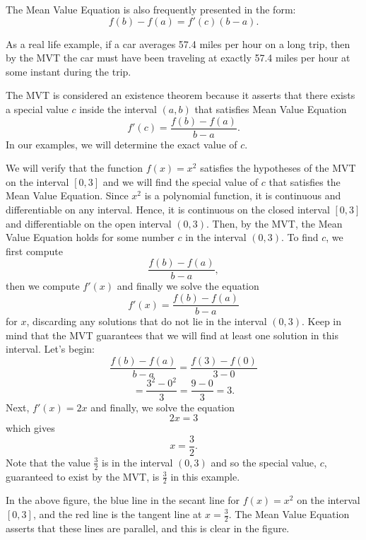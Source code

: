 \documentclass{ximera}
\begin{document}
The Mean Value Equation is also frequently presented in the form:
\[f(b) - f(a)=f'(c)(b-a).\]

As a real life example, if a car averages 57.4 miles per hour on a long trip, then by the MVT the car must have been 
traveling at exactly 57.4 miles per hour at some instant during the trip.

The MVT is considered an existence theorem because it asserts that there exists a special value $c$ inside the interval $(a,b)$
that satisfies Mean Value Equation 
\[f'(c) = \frac{f(b) - f(a)}{b-a}.\]
In our examples, we will determine the exact value of $c$. 

\begin{example}[example 1]
We will verify that the function $f(x) = x^2$ satisfies the hypotheses of the MVT
on the interval $[0,3]$ and we will find the special value of $c$ that satisfies the Mean Value Equation.
Since $x^2$ is a polynomial function, it is continuous and differentiable on any interval. 
Hence, it is continuous on the closed interval $[0, 3]$ and differentiable on the open interval $(0, 3)$. 
Then, by the MVT,  the Mean Value Equation holds for some number 
$c$ in the interval $(0, 3)$. To find $c$, we first compute
\[\frac{f(b) - f(a)}{b-a},\]
then we compute $f'(x)$
and finally we solve the equation
\[f'(x) = \frac{f(b) - f(a)}{b-a}\]
for $x$, discarding any solutions that do not lie in the interval $(0, 3)$.  
Keep in mind that the MVT guarantees that we will find at least one solution in this interval.
Let's begin:
\[\frac{f(b) - f(a)}{b-a} = \frac{f(3) - f(0)}{3-0} \]
\[= \frac{3^2 - 0^2}{3}= \frac{9 - 0}{3} = 3.\]
Next, $f'(x) = 2x$
and finally, we solve the equation
\[2x = 3\]
which gives
\[x = \frac{3}{2}.\]
Note that the value $\frac32$ is in the interval $(0,3)$ and so the special value, $c$, guaranteed to exist by the MVT,
is $\frac32$ in this example.


\begin{image}
\end{image}

In the above figure, the blue line in the secant line for $f(x) = x^2$ on the interval $[0, 3]$, 
and the red line is the tangent line at $x = \frac32$. The Mean Value Equation asserts that these lines are parallel, and this
is clear in the figure.
\end{example}
\end{document}
